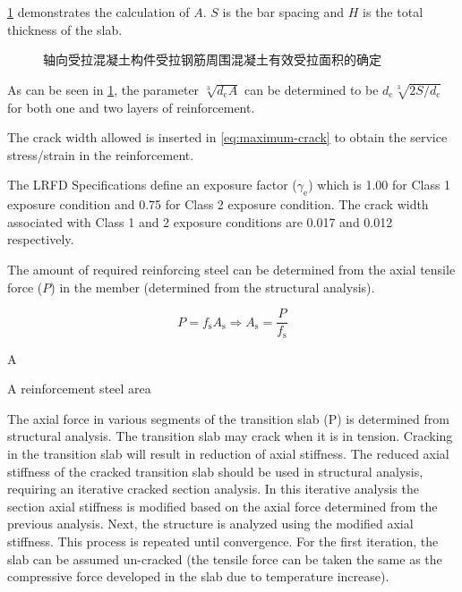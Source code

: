\cref{fig:effective-tension-area} demonstrates the calculation of $A$. $S$ is the bar spacing and $H$ is the total thickness of the slab.

\begin{figure}
  \caption{轴向受拉混凝土构件受拉钢筋周围混凝土有效受拉面积的确定}
  \label{fig:effective-tension-area}
\end{figure}

As can be seen in \cref{fig:effective-tension-area}, the parameter $\sqrt[3]{d_\text{c} A}$ can be determined to be $d_\text{c}\sqrt[3]{2S/d_\text{c}}$
for both one and two layers of reinforcement.

The crack width allowed is inserted in \cref{eq:maximum-crack} to obtain the service stress/strain in the reinforcement.

The LRFD Specifications define an exposure factor ($\gamma_\text{e}$) which is 1.00 for Class 1 exposure condition and 0.75 for Class 2 exposure condition. The crack width associated with Class 1 and 2 exposure conditions are 0.017 and 0.012 respectively.

The amount of required reinforcing steel can be determined from the axial tensile force ($P$) in the member (determined from the structural analysis).

\begin{equation}
  P = f_\text{s} A_\text{s} \Rightarrow  A_\text{s} = \frac{P}{f_\text{s}}
\end{equation}
\begin{EqDesc}{A}
  \item[A] reinforcement steel area
\end{EqDesc}

The axial force in various segments of the transition slab (P) is determined from structural analysis. The transition slab may crack when it is in tension. Cracking in the transition slab will result in reduction of axial stiffness. The reduced axial stiffness of the cracked transition slab should be used in structural analysis, requiring an iterative cracked section analysis. In this iterative analysis the section axial stiffness is modified based on the axial force determined from the previous analysis. Next, the structure is analyzed using the modified axial stiffness. This process is repeated until convergence. For the first iteration, the slab can be assumed un-cracked (the tensile force can be taken the same as the compressive force developed in the slab due to temperature increase).

